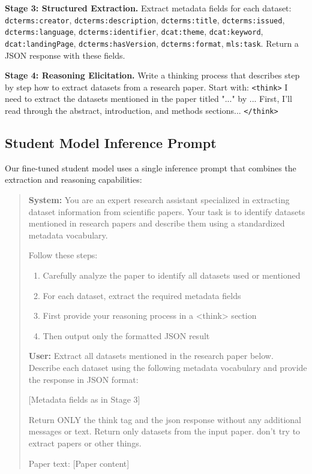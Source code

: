 \documentclass[runningheads]{llncs}
\begin{document}
\medskip
\noindent\textbf{Stage 3: Structured Extraction.} Extract metadata fields for each dataset: \texttt{dcterms:creator}, \texttt{dcterms:description}, \texttt{dcterms:title}, \texttt{dcterms:issued}, \texttt{dcterms:language}, \texttt{dcterms:identifier}, \texttt{dcat:theme}, \texttt{dcat:keyword}, \texttt{dcat:landingPage}, \texttt{dcterms:hasVersion}, \texttt{dcterms:format}, \texttt{mls:task}. Return a JSON response with these fields.

\medskip
\noindent\textbf{Stage 4: Reasoning Elicitation.} Write a thinking process that describes step by step how to extract datasets from a research paper. Start with: \texttt{<think>} I need to extract the datasets mentioned in the paper titled "..." by ... First, I'll read through the abstract, introduction, and methods sections... \texttt{</think>}

\subsection{Student Model Inference Prompt}

Our fine-tuned student model uses a single inference prompt that combines the extraction and reasoning capabilities:

\begin{quote}
\small
\textbf{System:} You are an expert research assistant specialized in extracting dataset information from scientific papers. Your task is to identify datasets mentioned in research papers and describe them using a standardized metadata vocabulary.

Follow these steps:
\begin{enumerate}
\item Carefully analyze the paper to identify all datasets used or mentioned
\item For each dataset, extract the required metadata fields
\item First provide your reasoning process in a <think> section
\item Then output only the formatted JSON result
\end{enumerate}

\textbf{User:} Extract all datasets mentioned in the research paper below. Describe each dataset using the following metadata vocabulary and provide the response in JSON format:

[Metadata fields as in Stage 3]

Return ONLY the think tag and the json response without any additional messages or text.
Return only datasets from the input paper. don't try to extract papers or other things.

Paper text: [Paper content]
\end{quote}





\end{document}
